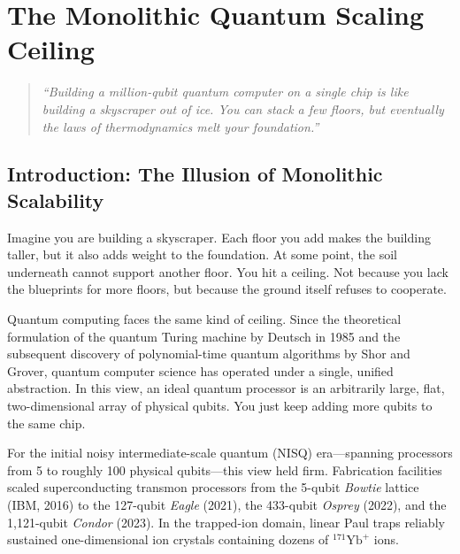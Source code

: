 \chapter{The Monolithic Quantum Scaling Ceiling}
\label{ch:scaling_ceiling}


\begin{quote}
\textit{``Building a million-qubit quantum computer on a single chip is like building a skyscraper out of ice. You can stack a few floors, but eventually the laws of thermodynamics melt your foundation.''}
\end{quote}

\section{Introduction: The Illusion of Monolithic Scalability}

Imagine you are building a skyscraper. Each floor you add makes the building taller, but it also adds weight to the foundation. At some point, the soil underneath cannot support another floor. You hit a ceiling. Not because you lack the blueprints for more floors, but because the ground itself refuses to cooperate.

Quantum computing faces the same kind of ceiling. Since the theoretical formulation of the quantum Turing machine by Deutsch in 1985 and the subsequent discovery of polynomial-time quantum algorithms by Shor and Grover, quantum computer science has operated under a single, unified abstraction. In this view, an ideal quantum processor is an arbitrarily large, flat, two-dimensional array of physical qubits. You just keep adding more qubits to the same chip.

For the initial noisy intermediate-scale quantum (NISQ) era---spanning processors from 5 to roughly 100 physical qubits---this view held firm. Fabrication facilities scaled superconducting transmon processors from the 5-qubit \textit{Bowtie} lattice (IBM, 2016) to the 127-qubit \textit{Eagle} (2021), the 433-qubit \textit{Osprey} (2022), and the 1,121-qubit \textit{Condor} (2023). In the trapped-ion domain, linear Paul traps reliably sustained one-dimensional ion crystals containing dozens of $^{171}\text{Yb}^+$ ions.

